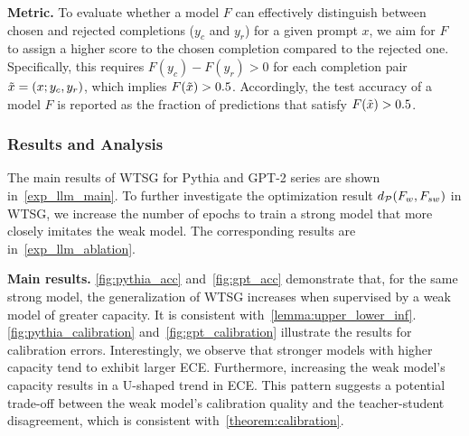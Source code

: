\noindent \textbf{Metric.}
To evaluate whether a model $F$ can effectively distinguish between chosen and rejected completions ($y_c$ and $y_r$) for a given prompt $x$, we aim for $F$ to assign a higher score to the chosen completion compared to the rejected one.
Specifically, this requires $F(y_c)-F(y_r)>0$ for each completion pair $\Tilde{x}=(x;y_c,y_r)$, which implies $F(\Tilde{x})>0.5$.
Accordingly, the test accuracy of a model $F$ is reported as the fraction of predictions that satisfy $F(\Tilde{x})>0.5$.





\subsubsection{Results and Analysis}
The main results of WTSG for Pythia and GPT-2 series are shown in~\cref{exp_llm_main}.
To further investigate the optimization result $d_\mathcal{P}(F_w, F_{sw})$ in WTSG,
we increase the number of epochs to train a strong model that more closely imitates the weak model.
The corresponding results are in~\cref{exp_llm_ablation}.

\noindent \textbf{Main results.}
\cref{fig:pythia_acc} and~\cref{fig:gpt_acc} demonstrate that, for the same strong model, the generalization of WTSG increases when supervised by a weak model of greater capacity.
It is consistent with~\cref{lemma:upper_lower_inf}.
\cref{fig:pythia_calibration} and~\cref{fig:gpt_calibration} illustrate the results for calibration errors. 
Interestingly, we observe that stronger models with higher capacity tend to exhibit larger ECE. 
Furthermore, increasing the weak model's capacity results in a U-shaped trend in ECE.
This pattern suggests a potential trade-off between the weak model's calibration quality and the teacher-student disagreement, which is consistent with~\cref{theorem:calibration}.





